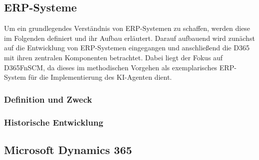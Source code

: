\subsection{ERP-Systeme}

Um ein grundlegendes Verständnis von \ac{ERP}-Systemen zu schaffen, werden diese im Folgenden definiert und ihr Aufbau erläutert. Darauf aufbauend wird zunächst auf die Entwicklung von \ac{ERP}-Systemen eingegangen und anschließend die D365 mit ihren zentralen Komponenten betrachtet. Dabei liegt der Fokus auf \ac{D365FnSCM}, da dieses im methodischen Vorgehen als exemplarisches \ac{ERP}-System für die Implementierung des \ac{KI}-Agenten dient.

\subsubsection{Definition und Zweck}

\subsubsection{Historische Entwicklung}

\subsection{Microsoft Dynamics 365} 
